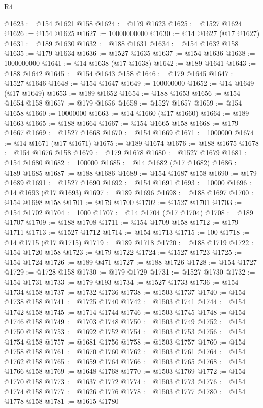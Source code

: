 \begin{lexlean}{R4}
\begin{coremodule}
@1623 := @154 @1621 @158
@1624 := @179 @1623
@1625 := @1527 @1624
@1626 := @154 @1625
@1627 := 10000000000
@1630 := @14 @1627 (@17 @1627)
@1631 := @189 @1630
@1632 := @188 @1631
@1634 := @154 @1632 @158
@1635 := @179 @1634
@1636 := @1527 @1635
@1637 := @154 @1636
@1638 := 1000000000
@1641 := @14 @1638 (@17 @1638)
@1642 := @189 @1641
@1643 := @188 @1642
@1645 := @154 @1643 @158
@1646 := @179 @1645
@1647 := @1527 @1646
@1648 := @154 @1647
@1649 := 100000000
@1652 := @14 @1649 (@17 @1649)
@1653 := @189 @1652
@1654 := @188 @1653
@1656 := @154 @1654 @158
@1657 := @179 @1656
@1658 := @1527 @1657
@1659 := @154 @1658
@1660 := 10000000
@1663 := @14 @1660 (@17 @1660)
@1664 := @189 @1663
@1665 := @188 @1664
@1667 := @154 @1665 @158
@1668 := @179 @1667
@1669 := @1527 @1668
@1670 := @154 @1669
@1671 := 1000000
@1674 := @14 @1671 (@17 @1671)
@1675 := @189 @1674
@1676 := @188 @1675
@1678 := @154 @1676 @158
@1679 := @179 @1678
@1680 := @1527 @1679
@1681 := @154 @1680
@1682 := 100000
@1685 := @14 @1682 (@17 @1682)
@1686 := @189 @1685
@1687 := @188 @1686
@1689 := @154 @1687 @158
@1690 := @179 @1689
@1691 := @1527 @1690
@1692 := @154 @1691
@1693 := 10000
@1696 := @14 @1693 (@17 @1693)
@1697 := @189 @1696
@1698 := @188 @1697
@1700 := @154 @1698 @158
@1701 := @179 @1700
@1702 := @1527 @1701
@1703 := @154 @1702
@1704 := 1000
@1707 := @14 @1704 (@17 @1704)
@1708 := @189 @1707
@1709 := @188 @1708
@1711 := @154 @1709 @158
@1712 := @179 @1711
@1713 := @1527 @1712
@1714 := @154 @1713
@1715 := 100
@1718 := @14 @1715 (@17 @1715)
@1719 := @189 @1718
@1720 := @188 @1719
@1722 := @154 @1720 @158
@1723 := @179 @1722
@1724 := @1527 @1723
@1725 := @154 @1724
@1726 := @189 @471
@1727 := @188 @1726
@1728 := @154 @1727
@1729 := @1728 @158
@1730 := @179 @1729
@1731 := @1527 @1730
@1732 := @154 @1731
@1733 := @179 @193
@1734 := @1527 @1733
@1736 := @154 @1734 @158
@1737 := @1732 @1736
@1738 := @1503 @1737
@1740 := @154 @1738 @158
@1741 := @1725 @1740
@1742 := @1503 @1741
@1744 := @154 @1742 @158
@1745 := @1714 @1744
@1746 := @1503 @1745
@1748 := @154 @1746 @158
@1749 := @1703 @1748
@1750 := @1503 @1749
@1752 := @154 @1750 @158
@1753 := @1692 @1752
@1754 := @1503 @1753
@1756 := @154 @1754 @158
@1757 := @1681 @1756
@1758 := @1503 @1757
@1760 := @154 @1758 @158
@1761 := @1670 @1760
@1762 := @1503 @1761
@1764 := @154 @1762 @158
@1765 := @1659 @1764
@1766 := @1503 @1765
@1768 := @154 @1766 @158
@1769 := @1648 @1768
@1770 := @1503 @1769
@1772 := @154 @1770 @158
@1773 := @1637 @1772
@1774 := @1503 @1773
@1776 := @154 @1774 @158
@1777 := @1626 @1776
@1778 := @1503 @1777
@1780 := @154 @1778 @158
@1781 := @1615 @1780

\end{coremodule}
\end{lexlean}

